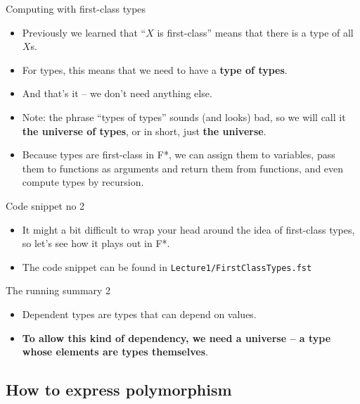 \documentclass{beamer}
\newcommand{\m}[1]{\texttt{#1}}
\begin{document}
\begin{frame}{Computing with first-class types}
\begin{itemize}
	\item Previously we learned that ``$X$ is first-class'' means that there is a type of all $X$s.
	\item For types, this means that we need to have a \textbf{type of types}.
	\item And that's it -- we don't need anything else.
	\item Note: the phrase ``types of types'' sounds (and looks) bad, so we will call it \textbf{the universe of types}, or in short, just \textbf{the universe}.
	\item Because types are first-class in F*, we can assign them to variables, pass them to functions as arguments and return them from functions, and even compute types by recursion.
\end{itemize}
\end{frame}

\begin{frame}{Code snippet no 2}
\begin{itemize}
	\item It might a bit difficult to wrap your head around the idea of first-class types, so let's see how it plays out in F*.
	\item The code snippet can be found in \m{Lecture1/FirstClassTypes.fst}
\end{itemize}
\end{frame}

\begin{frame}{The running summary 2}
\begin{itemize}
	\item Dependent types are types that can depend on values.
	\item \textbf{To allow this kind of dependency, we need a universe -- a type whose elements are types themselves}.
\end{itemize}
\end{frame}

\subsection{How to express polymorphism}

\end{document}
